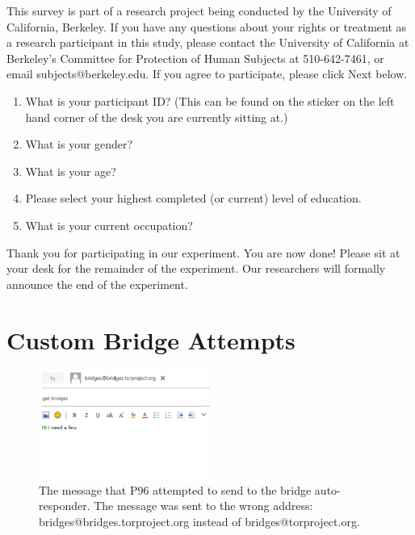 \documentclass[USenglish,oneside,twocolumn]{article}
\begin{document}
This survey is part of a research project being conducted by the University of California, Berkeley. If you have any questions about your rights or treatment as a research participant in this study, please contact the University of California at Berkeley's Committee for Protection of Human Subjects at 510-642-7461, or email subjects@berkeley.edu. If you agree to participate, please click Next below.\\

\begin{enumerate}
\item{What is your participant ID? (This can be found on the sticker on the left hand corner of the desk you are currently sitting at.)}
\item{What is your gender?}
\item{What is your age?}
\item{Please select your highest completed (or current) level of education}.
\item{What is your current occupation?}  
\end{enumerate}

Thank you for participating in our experiment. You are now done! Please sit at your desk for the remainder of the experiment. Our researchers will formally announce the end of the experiment. 

\section{Custom Bridge Attempts} 
\label{failed-participants}

\begin{figure}[h]
\includegraphics[width=0.5\textwidth]{../experiment/processing/failed-participants/20160325-140813-bridgeresponder-redacted.png}
\caption{The message that P96 attempted to send to the bridge auto-responder. The message was sent to the wrong address: bridges@bridges.torproject.org instead of bridges@torproject.org.}
\label{autoresponder1}
\end{figure} 
\end{document}
